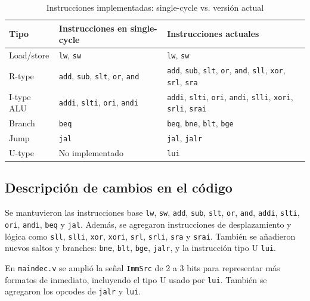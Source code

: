 \begin{table}[h]
\centering
\caption{Instrucciones implementadas: single-cycle vs. versión actual}
\label{tab:instrucciones}
\small
\begin{tabular}{|l|p{4.5cm}|p{5.5cm}|}
\hline
\textbf{Tipo} & \textbf{Instrucciones en single-cycle} & \textbf{Instrucciones actuales} \\
\hline
Load/store  & \texttt{lw}, \texttt{sw} & \texttt{lw}, \texttt{sw} \\
\hline
R-type      & \texttt{add}, \texttt{sub}, \texttt{slt}, \texttt{or}, \texttt{and} & \texttt{add}, \texttt{sub}, \texttt{slt}, \texttt{or}, \texttt{and}, \texttt{sll}, \texttt{xor}, \texttt{srl}, \texttt{sra} \\
\hline
I-type ALU  & \texttt{addi}, \texttt{slti}, \texttt{ori}, \texttt{andi} & \texttt{addi}, \texttt{slti}, \texttt{ori}, \texttt{andi}, \texttt{slli}, \texttt{xori}, \texttt{srli}, \texttt{srai} \\
\hline
Branch      & \texttt{beq} & \texttt{beq}, \texttt{bne}, \texttt{blt}, \texttt{bge} \\
\hline
Jump        & \texttt{jal} & \texttt{jal}, \texttt{jalr} \\
\hline
U-type      & No implementado & \texttt{lui} \\
\hline
\end{tabular}
\end{table}

\subsection{Descripción de cambios en el código}

Se mantuvieron las instrucciones base \texttt{lw}, \texttt{sw}, \texttt{add}, \texttt{sub}, \texttt{slt}, \texttt{or}, \texttt{and}, \texttt{addi}, \texttt{slti}, \texttt{ori}, \texttt{andi}, \texttt{beq} y \texttt{jal}. Además, se agregaron instrucciones de desplazamiento y lógica como \texttt{sll}, \texttt{slli}, \texttt{xor}, \texttt{xori}, \texttt{srl}, \texttt{srli}, \texttt{sra} y \texttt{srai}. También se añadieron nuevos saltos y branches: \texttt{bne}, \texttt{blt}, \texttt{bge}, \texttt{jalr}, y la instrucción tipo U \texttt{lui}.

En \texttt{maindec.v} se amplió la señal \texttt{ImmSrc} de 2 a 3 bits para representar más formatos de inmediato, incluyendo el tipo U usado por \texttt{lui}. También se agregaron los opcodes de \texttt{jalr} y \texttt{lui}.

